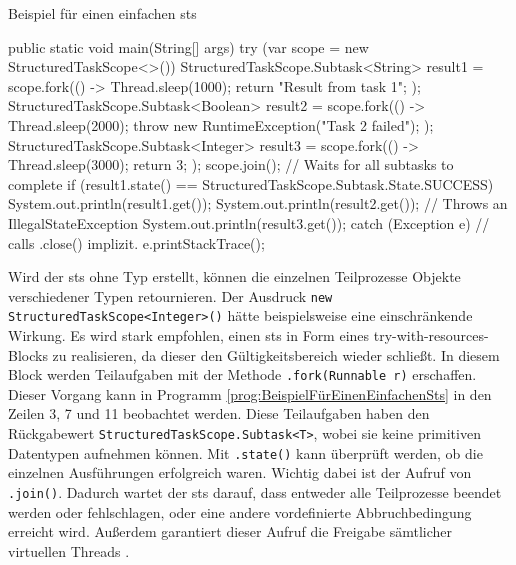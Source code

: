     \begin{program} [H]
        \caption{Beispiel für einen einfachen \gls{sts}}
        \label{prog:BeispielFürEinenEinfachenSts}
    \begin{JavaCode}[language=Java, numbers=left]
public static void main(String[] args) {
    try (var scope = new StructuredTaskScope<>()) {
        StructuredTaskScope.Subtask<String> result1 = scope.fork(() -> {
            Thread.sleep(1000);
            return "Result from task 1";
        });
        StructuredTaskScope.Subtask<Boolean> result2 = scope.fork(() -> {
            Thread.sleep(2000);
            throw new RuntimeException("Task 2 failed");
        });
        StructuredTaskScope.Subtask<Integer> result3 = scope.fork(() -> {
            Thread.sleep(3000);
            return 3;
        });
        scope.join();                        // Waits for all subtasks to complete
        if (result1.state() == StructuredTaskScope.Subtask.State.SUCCESS){
            System.out.println(result1.get());  
        } 
        System.out.println(result2.get());   // Throws an IllegalStateException
        System.out.println(result3.get());
    } catch (Exception e) {                  // calls .close() implizit.
        e.printStackTrace();
    }
}\end{JavaCode}
    \end{program}
    Wird der \gls{sts} ohne Typ erstellt, können die einzelnen Teilprozesse Objekte verschiedener Typen retournieren. Der Ausdruck \texttt{new StructuredTaskScope<Integer>()}
    hätte beispielsweise eine einschränkende Wirkung.
    Es wird stark empfohlen, einen \gls{sts} in Form eines try-with-resources-Blocks zu realisieren, da dieser den Gültigkeitsbereich wieder schließt. In diesem Block
    werden Teilaufgaben mit der Methode \texttt{.fork(Runnable r)} erschaffen. Dieser Vorgang kann in Programm \ref{prog:BeispielFürEinenEinfachenSts} in den Zeilen 3, 7 und 11 beobachtet werden.
    Diese Teilaufgaben haben den Rückgabewert \texttt{StructuredTaskScope.Sub\-task<T>}, wobei sie keine
    primitiven Datentypen aufnehmen können. Mit \texttt{.state()} kann überprüft werden, ob die einzelnen Ausführungen erfolgreich waren.
    Wichtig dabei ist der Aufruf von \texttt{.join()}. Dadurch wartet der \gls{sts} darauf, dass entweder alle Teilprozesse beendet werden oder
    fehlschlagen, oder
    eine andere vordefinierte Abbruchbedingung erreicht wird. Außerdem garantiert dieser Aufruf die Freigabe sämtlicher virtuellen Threads \cite{oracle21STS}.
    

